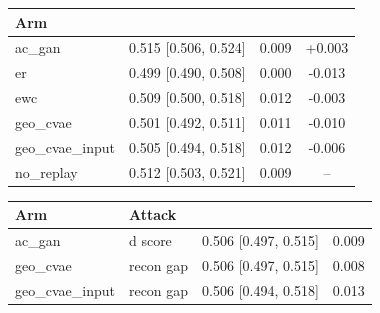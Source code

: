 \begin{tabular}{lccc}
\toprule
\textbf{Arm} & \textbf{AUC (95\\%
\midrule
ac_gan & 0.515 [0.506, 0.524] & 0.009 & +0.003 \\
er & 0.499 [0.490, 0.508] & 0.000 & -0.013 \\
ewc & 0.509 [0.500, 0.518] & 0.012 & -0.003 \\
geo_cvae & 0.501 [0.492, 0.511] & 0.011 & -0.010 \\
geo_cvae_input & 0.505 [0.494, 0.518] & 0.012 & -0.006 \\
no_replay & 0.512 [0.503, 0.521] & 0.009 & -- \\
\bottomrule
\end{tabular}

\begin{tabular}{llcc}
\toprule
\textbf{Arm} & \textbf{Attack} & \textbf{AUC (95\\%
\midrule
ac_gan & d score & 0.506 [0.497, 0.515] & 0.009 \\
geo_cvae & recon gap & 0.506 [0.497, 0.515] & 0.008 \\
geo_cvae_input & recon gap & 0.506 [0.494, 0.518] & 0.013 \\
\bottomrule
\end{tabular}
